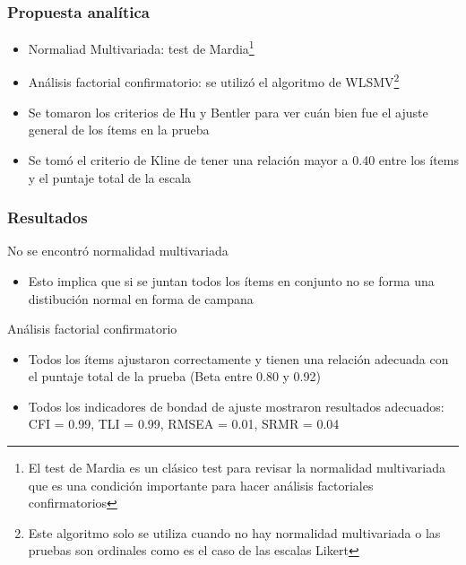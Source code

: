 \documentclass{beamer}
\begin{document}
\begin{frame}
\frametitle{Propuesta analítica}

\begin{itemize}
\item Normaliad Multivariada: test de Mardia\footnote{El test de Mardia es un clásico test para revisar la normalidad multivariada que es una condición importante para hacer análisis factoriales confirmatorios}	
\item Análisis factorial confirmatorio: se utilizó el algoritmo de WLSMV\footnote{Este algoritmo solo se utiliza cuando no hay normalidad multivariada o las pruebas son ordinales como es el caso de las escalas Likert}	
\item Se tomaron los criterios de Hu y Bentler para ver cuán bien fue el ajuste general de los ítems en la prueba
\item Se tomó el criterio de Kline de tener una relación mayor a 0.40 entre los ítems y el puntaje total de la escala


\end{itemize}	

\end{frame}

\begin{frame}
\frametitle{Resultados}


\begin{block}{No se encontró normalidad multivariada}
\begin{itemize}
\item Esto implica que si se juntan todos los ítems en conjunto no se forma una distibución normal en forma de campana
\end{itemize}
\end{block}

\begin{examples}{Análisis factorial confirmatorio}
\begin{itemize}
\item Todos los ítems ajustaron correctamente y tienen una relación adecuada con el puntaje total de la prueba (Beta entre 0.80 y 0.92)
\item Todos los indicadores de bondad de ajuste mostraron resultados adecuados: CFI  = 0.99, TLI = 0.99, RMSEA = 0.01, SRMR = 0.04 
\end{itemize}
\end{examples}

\end{frame}
\end{document}
